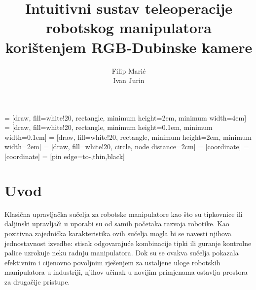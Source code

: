 \documentclass[times, utf8, diplomski, numeric]{fer}
\begin{document}
\renewcommand{\labelitemi}{$\bullet$}
 = [draw, fill=white!20, rectangle,
    minimum height=2em, minimum width=4em]
 = [draw, fill=white!20, rectangle, 
    minimum height=0.1em, minimum width=0.1em]    
 = [draw, fill=white!20, rectangle, 
    minimum height=2em, minimum width=2em]
 = [draw, fill=white!20, circle, node distance=2cm]
 = [coordinate]
 = [coordinate]
 = [pin edge={to-,thin,black}]


\title{Intuitivni sustav teleoperacije robotskog manipulatora korištenjem RGB-Dubinske kamere}

\author{Filip Marić \\ Ivan Jurin}

\maketitle


\tableofcontents

\chapter{Uvod}
Klasična upravljačka sučelja za robotske manipulatore kao što su tipkovnice ili daljinski upravljači u uporabi su od samih početaka razvoja robotike.
Kao pozitivna zajednička karakteristika ovih sučelja mogla bi se navesti njihova jednostavnost izvedbe: stisak odgovarajuće kombinacije tipki ili guranje kontrolne palice uzrokuje neku radnju manipulatora.
Dok su se ovakva sučelja pokazala efektivnim i cijenovno povoljnim rješenjem za ustaljene uloge robotskih manipulatora u industriji, njihov učinak u novijim primjenama ostavlja prostora za drugačije pristupe.
\end{document}
